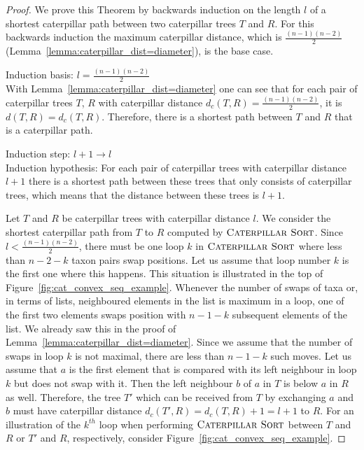 \documentclass{amsart}
\newcommand{\csort}{\textsc{Caterpillar Sort}}
\begin{document}
\begin{proof}
    We prove this Theorem by backwards induction on the length $l$ of a shortest caterpillar path between two caterpillar trees $T$ and $R$.
    For this backwards induction the maximum caterpillar distance, which is $\frac{(n-1)(n-2)}{2}$ (Lemma~\ref{lemma:caterpillar_dist=diameter}), is the base case.

    Induction basis: $l = \frac{(n-1)(n-2)}{2}$\\
    With Lemma~\ref{lemma:caterpillar_dist=diameter} one can see that for each pair of caterpillar trees $T$, $R$ with caterpillar distance $d_c(T,R) = \frac{(n-1)(n-2)}{2}$, it is $d(T,R) = d_c(T,R)$.
    Therefore, there is a shortest path between $T$ and $R$ that is a caterpillar path.

    Induction step: $l+1 \to l$\\
    Induction hypothesis: For each pair of caterpillar trees with caterpillar distance $l+1$ there is a shortest path between these trees that only consists of caterpillar trees, which means that the distance between these trees is $l+1$.

    Let $T$ and $R$ be caterpillar trees with caterpillar distance $l$.
    We consider the shortest caterpillar path from $T$ to $R$ computed by $\csort$.
    Since $l < \frac{(n-1)(n-2)}{2}$, there must be one loop $k$ in $\csort$ where less than $n-2-k$ taxon pairs swap positions.
    Let us assume that loop number $k$ is the first one where this happens.
    This situation is illustrated in the top of Figure~\ref{fig:cat_convex_seq_example}.
    Whenever the number of swaps of taxa or, in terms of lists, neighboured elements in the list is maximum in a loop, one of the first two elements swaps position with $n-1-k$ subsequent elements of the list.
    We already saw this in the proof of Lemma~\ref{lemma:caterpillar_dist=diameter}.
    Since we assume that the number of swaps in loop $k$ is not maximal, there are less than $n-1-k$ such moves.
    Let us assume that $a$ is the first element that is compared with its left neighbour in loop $k$ but does not swap with it.
    Then the left neighbour $b$ of $a$ in $T$ is below $a$ in $R$ as well.
    Therefore, the tree $T'$ which can be received from $T$ by exchanging $a$ and $b$ must have caterpillar distance $d_c(T',R) = d_c(T,R) + 1 = l + 1$ to $R$.
    For an illustration of the $k^{th}$ loop when performing $\csort$ between $T$ and $R$ or $T'$ and $R$, respectively, consider Figure~\ref{fig:cat_convex_seq_example}.


\end{proof}
\end{document}
